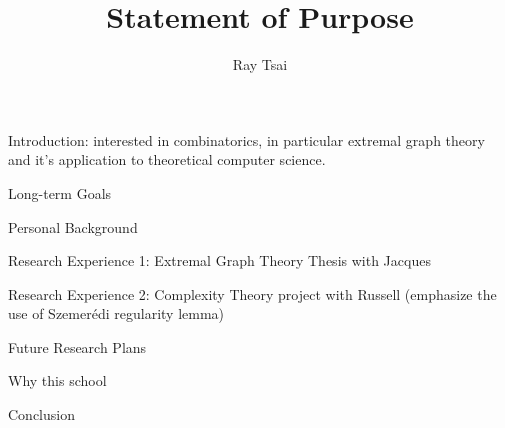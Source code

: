 \documentclass[12pt]{article}
\title{Statement of Purpose}
\author{Ray Tsai}
\date{}
\begin{document}
\maketitle

Introduction: interested in combinatorics, in particular extremal graph theory and it's application
to theoretical computer science.

Long-term Goals

Personal Background

Research Experience 1: Extremal Graph Theory Thesis with Jacques

Research Experience 2: Complexity Theory project with Russell (emphasize the use of Szemerédi
regularity lemma)

Future Research Plans

Why this school

Conclusion
\end{document}
